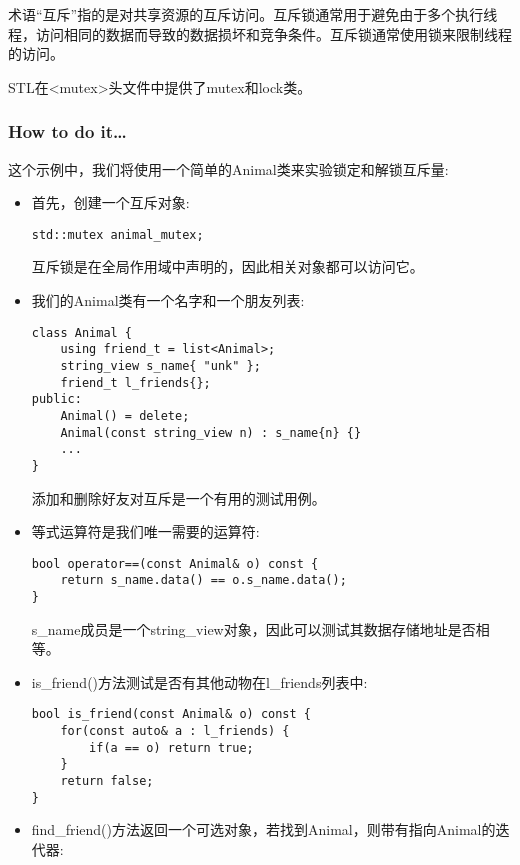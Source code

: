 
术语“互斥”指的是对共享资源的互斥访问。互斥锁通常用于避免由于多个执行线程，访问相同的数据而导致的数据损坏和竞争条件。互斥锁通常使用锁来限制线程的访问。

STL在<mutex>头文件中提供了mutex和lock类。


\subsubsection{How to do it…}

这个示例中，我们将使用一个简单的Animal类来实验锁定和解锁互斥量:

\begin{itemize}
\item 
首先，创建一个互斥对象:

\begin{lstlisting}[style=styleCXX]
std::mutex animal_mutex;
\end{lstlisting}

互斥锁是在全局作用域中声明的，因此相关对象都可以访问它。

\item 
我们的Animal类有一个名字和一个朋友列表:

\begin{lstlisting}[style=styleCXX]
class Animal {
	using friend_t = list<Animal>;
	string_view s_name{ "unk" };
	friend_t l_friends{};
public:
	Animal() = delete;
	Animal(const string_view n) : s_name{n} {}
	...
}
\end{lstlisting}

添加和删除好友对互斥是一个有用的测试用例。

\item 
等式运算符是我们唯一需要的运算符:

\begin{lstlisting}[style=styleCXX]
bool operator==(const Animal& o) const {
	return s_name.data() == o.s_name.data();
}
\end{lstlisting}

s\_name成员是一个string\_view对象，因此可以测试其数据存储地址是否相等。

\item 
is\_friend()方法测试是否有其他动物在l\_friends列表中:

\begin{lstlisting}[style=styleCXX]
bool is_friend(const Animal& o) const {
	for(const auto& a : l_friends) {
		if(a == o) return true;
	}
	return false;
}
\end{lstlisting}

\item 
find\_friend()方法返回一个可选对象，若找到Animal，则带有指向Animal的迭代器:


\end{itemize}

